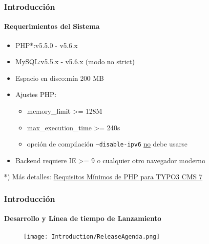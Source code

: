 
\begin{frame}[fragile]
	\frametitle{Introducción}
	\framesubtitle{Requerimientos del Sistema}

	\begin{itemize}
		\item PHP*:\tabto{3.2cm}v5.5.0 - v5.6.x
		\item MySQL:\tabto{3.2cm}v5.5.x - v5.6.x (modo no strict)
		\item Espacio en disco:\tabto{3.2cm}mín 200 MB
		\item Ajustes PHP:

			\begin{itemize}
				\item memory\_limit >= 128M
				\item max\_execution\_time >= 240s
				\item opción de compilación \texttt{--disable-ipv6} \underline{no} debe usarse
			\end{itemize}

		\item Backend requiere IE >= 9 o cualquier otro navegador moderno

	\end{itemize}

	\vspace{1cm}
	*) Más detalles: \href{http://typo3.org/news/article/php-minimum-requirements-for-typo3-cms-7/}{Requisitos Mínimos de PHP para TYPO3 CMS 7}

\end{frame}


\begin{frame}[fragile]
	\frametitle{Introducción}
	\framesubtitle{Desarrollo y Línea de tiempo de Lanzamiento}

	\begin{figure}
		\texttt{[image: Introduction/ReleaseAgenda.png]}
	\end{figure}

\end{frame}

